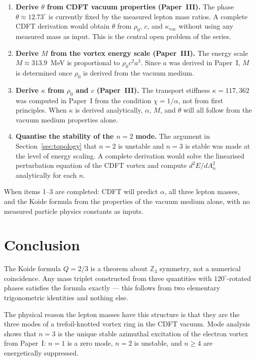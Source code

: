 \documentclass[11pt]{article}
\begin{document}
\begin{enumerate}

\item \textbf{Derive $\theta$ from CDFT vacuum properties (Paper~III).}
The phase $\theta \approx 12.73^\circ$ is currently fixed by the measured lepton
mass ratios.
A complete CDFT derivation would obtain $\theta$ from $\rho_0$, $c$, and
$\kappa_\text{vac}$ without using any measured mass as input.
This is the central open problem of the series.

\item \textbf{Derive $M$ from the vortex energy scale (Paper~III).}
The energy scale $M \approx 313.9$~MeV is proportional to $\rho_0 c^2 a^3$.
Since $a$ was derived in Paper~I, $M$ is determined once $\rho_0$ is derived
from the vacuum medium.

\item \textbf{Derive $\kappa$ from $\rho_0$ and $c$ (Paper~III).}
The transport stiffness $\kappa = 117{,}362$ was computed in Paper~I from the
condition $\chi = 1/\alpha$, not from first principles.
When $\kappa$ is derived analytically, $\alpha$, $M$, and $\theta$ will all
follow from the vacuum medium properties alone.

\item \textbf{Quantise the stability of the $n=2$ mode.}
The argument in Section~\ref{sec:topology} that $n = 2$ is unstable and $n = 3$
is stable was made at the level of energy scaling.
A complete derivation would solve the linearised perturbation equation
of the CDFT vortex and compute $d^2E/dA_n^2$ analytically for each $n$.

\end{enumerate}

When items 1--3 are completed: CDFT will predict $\alpha$, all three lepton masses,
and the Koide formula from the properties of the vacuum medium alone,
with no measured particle physics constants as inputs.


\section{Conclusion}

The Koide formula $Q = 2/3$ is a theorem about $\mathbb{Z}_3$ symmetry,
not a numerical coincidence.
Any mass triplet constructed from three quantities with $120^\circ$-rotated phases
satisfies the formula exactly --- this follows from two elementary trigonometric
identities and nothing else.

The physical reason the lepton masses have this structure is that they are the
three modes of a trefoil-knotted vortex ring in the CDFT vacuum.
Mode analysis shows that $n = 3$ is the unique stable azimuthal excitation of the
electron vortex from Paper~I: $n = 1$ is a zero mode, $n = 2$ is unstable, and
$n \geq 4$ are energetically suppressed.
\end{document}
